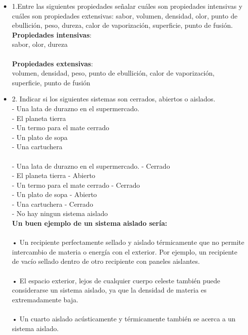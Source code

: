 \documentclass{article}
\begin{document}
\begin{itemize}
\item{1.Entre las siguientes propiedades señalar cuáles son propiedades intensivas y cuáles son propiedades extensivas: sabor, volumen, densidad, olor, punto de ebullición, peso, dureza, calor de vaporización, superficie, punto de fusión.} \\
\textbf{Propiedades intensivas}:\\
sabor, olor, dureza\\
\\
\textbf{Propiedades extensivas}:\\
volumen, densidad, peso, punto de ebullición, calor de vaporización, superficie, punto de fusión\\

\item{2. Indicar si los siguientes sistemas son cerrados, abiertos o aislados.}\\
- Una lata de durazno en el supermercado.\\
- El planeta tierra\\
- Un termo para el mate cerrado\\
- Un plato de sopa\\
- Una cartuchera\\
\\
- Una lata de durazno en el supermercado. - Cerrado\\
- El planeta tierra - Abierto\\
- Un termo para el mate cerrado - Cerrado\\
- Un plato de sopa - Abierto\\
- Una cartuchera - Cerrado\\
- No hay ningun sistema aislado \\
\textbf {Un buen ejemplo de un sistema aislado sería:}\\
\\
• Un recipiente perfectamente sellado y aislado térmicamente que no permite intercambio de materia o energía con el exterior. Por ejemplo, un recipiente de vacío sellado dentro de otro recipiente con paneles aislantes.\\
\\
• El espacio exterior, lejos de cualquier cuerpo celeste también puede considerarse un sistema aislado, ya que la densidad de materia es extremadamente baja.\\
\\
• Un cuarto aislado acústicamente y térmicamente también se acerca a un sistema aislado.\\

\end{itemize}
\end{document}
